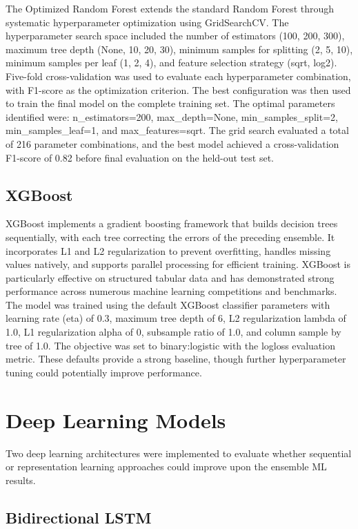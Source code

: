 \documentclass[12pt,letterpaper]{report}
\begin{document}
The Optimized Random Forest extends the standard Random Forest through systematic hyperparameter optimization using GridSearchCV. The hyperparameter search space included the number of estimators (100, 200, 300), maximum tree depth (None, 10, 20, 30), minimum samples for splitting (2, 5, 10), minimum samples per leaf (1, 2, 4), and feature selection strategy (sqrt, log2). Five-fold cross-validation was used to evaluate each hyperparameter combination, with F1-score as the optimization criterion. The best configuration was then used to train the final model on the complete training set. The optimal parameters identified were: n\_estimators=200, max\_depth=None, min\_samples\_split=2, min\_samples\_leaf=1, and max\_features=sqrt. The grid search evaluated a total of 216 parameter combinations, and the best model achieved a cross-validation F1-score of 0.82 before final evaluation on the held-out test set.

\subsection{XGBoost}

XGBoost implements a gradient boosting framework that builds decision trees sequentially, with each tree correcting the errors of the preceding ensemble. It incorporates L1 and L2 regularization to prevent overfitting, handles missing values natively, and supports parallel processing for efficient training. XGBoost is particularly effective on structured tabular data and has demonstrated strong performance across numerous machine learning competitions and benchmarks. The model was trained using the default XGBoost classifier parameters with learning rate (eta) of 0.3, maximum tree depth of 6, L2 regularization lambda of 1.0, L1 regularization alpha of 0, subsample ratio of 1.0, and column sample by tree of 1.0. The objective was set to binary:logistic with the logloss evaluation metric. These defaults provide a strong baseline, though further hyperparameter tuning could potentially improve performance.

\section{Deep Learning Models}

Two deep learning architectures were implemented to evaluate whether sequential or representation learning approaches could improve upon the ensemble ML results.

\subsection{Bidirectional LSTM}
\end{document}

